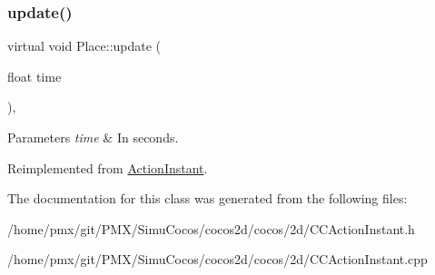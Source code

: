 \mbox{\label{classPlace_a1ab3900efa596c098e0fb84232050435}} 
\subsubsection{\texorpdfstring{update()}{update()}\hspace{0.1cm}{\footnotesize\ttfamily [2/2]}}
{\footnotesize\ttfamily virtual void Place\+::update (\begin{DoxyParamCaption}\item[{float}]{time }\end{DoxyParamCaption})\hspace{0.3cm}{\ttfamily [override]}, {\ttfamily [virtual]}}


\begin{DoxyParams}{Parameters}
{\em time} & In seconds. \\
\hline
\end{DoxyParams}


Reimplemented from \hyperlink{classActionInstant_a59875bf08cd1f58c0c8c6693ac540ade}{Action\+Instant}.



The documentation for this class was generated from the following files\+:\begin{DoxyCompactItemize}
\item 
/home/pmx/git/\+P\+M\+X/\+Simu\+Cocos/cocos2d/cocos/2d/C\+C\+Action\+Instant.\+h\item 
/home/pmx/git/\+P\+M\+X/\+Simu\+Cocos/cocos2d/cocos/2d/C\+C\+Action\+Instant.\+cpp\end{DoxyCompactItemize}
